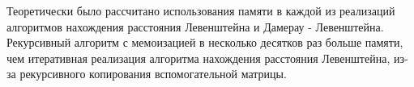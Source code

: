\documentclass[12pt]{report}
\begin{document}
Теоретически было рассчитано использования памяти в каждой из реализаций алгоритмов нахождения расстояния Левенштейна и Дамерау - Левенштейна. Рекурсивный алгоритм с мемоизацией в несколько десятков раз больше памяти, чем итеративная реализация алгоритма нахождения расстояния Левенштейна, из-за рекурсивного копирования вспомогательной матрицы.



\end{document}
